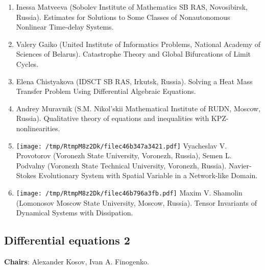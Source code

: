 \documentclass[
]{article}
\providecommand{\tightlist}{%
  \setlength{\itemsep}{0pt}\setlength{\parskip}{0pt}}
\begin{document}
\begin{enumerate}
\def\labelenumi{\arabic{enumi}.}
\tightlist
\item
  Inessa Matveeva (Sobolev Institute of Mathematics SB RAS, Novosibirsk,
  Russia). Estimates for Solutions to Some Classes of Nonautonomous
  Nonlinear Time-delay Systems.
\item
  Valery Gaiko (United Institute of Informatics Problems, National
  Academy of Sciences of Belarus). Catastrophe Theory and Global
  Bifurcations of Limit Cycles.
\item
  Elena Chistyakova (IDSCT SB RAS, Irkutsk, Russia). Solving a Heat Mass
  Transfer Problem Using Differential Algebraic Equations.
\item
  Andrey Muravnik (S.M. Nikol'skii Mathematical Institute of RUDN,
  Moscow, Russia). Qualitative theory of equations and inequalities with
  KPZ-nonlinearities.
\item
  \protect\texttt{[image: /tmp/RtmpM8z2Dk/filec46b347a3421.pdf]}
  Vyacheslav V. Provotorov (Voronezh State University, Voronezh,
  Russia), Semen L. Podvalny (Voronezh State Technical University,
  Voronezh, Russia). Navier-Stokes Evolutionary System with Spatial
  Variable in a Network-like Domain.
\item
  \protect\texttt{[image: /tmp/RtmpM8z2Dk/filec46b796a3fb.pdf]}
  Maxim V. Shamolin (Lomonosov Moscow State University, Moscow, Russia).
  Tensor Invariants of Dynamical Systems with Dissipation.
\end{enumerate}

\hypertarget{de2}{%
\subsection{Differential equations 2}\label{de2}}

\textbf{Chairs}: Alexander Kosov, Ivan A. Finogenko.
\end{document}
